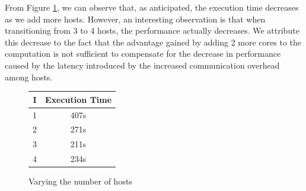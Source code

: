 \documentclass[11pt]{article}
\begin{document}
From Figure \ref{fig:hosts}, we can observe that, as anticipated, the execution time decreases as we add more hosts. However, an interesting observation is that when transitioning from 3 to 4 hosts, the performance actually decreases. We attribute this decrease to the fact that the advantage gained by adding 2 more cores to the computation is not sufficient to compensate for the decrease in performance caused by the latency introduced by the increased communication overhead among hosts.

\begin{figure}[h]
\caption{Varying the number of hosts}
\label{fig:hosts}
\begin{minipage}{0.5\textwidth}
  \centering
  \begin{tabular}{|c|c|}
    \hline
    \textbf{I} & \textbf{Execution Time} \\
    \hline
    1 & 407s \\ 
    2 & 271s \\ 
    3 & 211s \\ 
    4 & 234s \\
    \hline
  \end{tabular}
\end{minipage}%
\centering
\begin{minipage}{0.5\textwidth}
    \end{minipage}
\end{figure}
\end{document}
